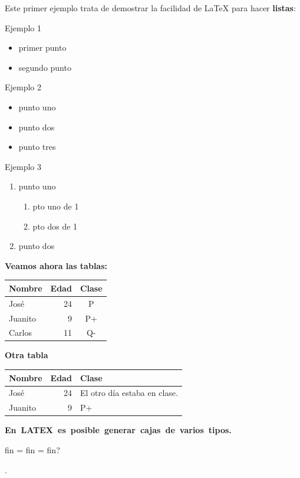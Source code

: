 \documentclass[12pt,a4paper]{article}
\begin{document}
\medskip
Este primer ejemplo trata de demostrar la facilidad de
\LaTeX{} para hacer \textbf{listas}:

Ejemplo 1
\begin{itemize}
\item primer punto
\item segundo punto
\end{itemize}

Ejemplo 2
\begin{itemize}
\item[*] punto uno
\item[$*$] punto dos
\item[$\circ$] punto tres
\end{itemize}

Ejemplo 3
\begin{enumerate}
\item punto uno
\begin{enumerate}
\item pto uno de 1
\item pto dos de 1
\end{enumerate}
\item punto dos
\end{enumerate}

\textbf{Veamos ahora las tablas:}


\begin{tabular}{lrc}
Nombre & Edad & Clase \\
\hline
José & 24 & P \\
Juanito & 9 & P+ \\
Carlos & 11 & Q-
\end{tabular}

\textbf{Otra tabla}

\begin{center}
\begin{tabular}{|l||r|p{2cm}|}
\hline
Nombre & Edad & Clase \\
\hline \hline
José & 24 & El otro día
estaba en clase. \\
Juanito & 9 & P+ \\
\hline
\end{tabular}
\end{center}



\mbox{\textbf{En LATEX es posible generar cajas de varios tipos.}}


fin = f\null{}in = f\mbox{}in?

.
\end{document}
